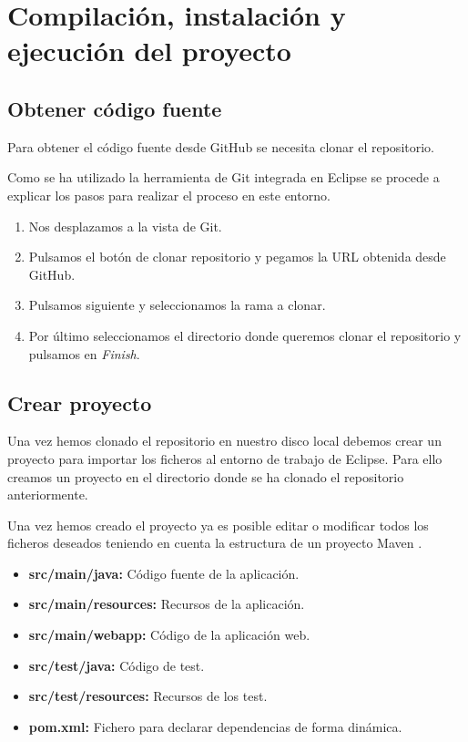 \section{Compilación, instalación y ejecución del proyecto}

\subsection{Obtener código fuente}

Para obtener el código fuente desde GitHub se necesita clonar el repositorio.

Como se ha utilizado la herramienta de Git integrada en Eclipse se procede a explicar los pasos para realizar el proceso en este entorno.

\begin{enumerate}
\item Nos desplazamos a la vista de Git.
\item Pulsamos el botón de clonar repositorio y pegamos la URL obtenida desde GitHub.
\item Pulsamos siguiente y seleccionamos la rama a clonar.
\item Por último seleccionamos el directorio donde queremos clonar el repositorio y pulsamos en \emph{Finish}.
\end{enumerate}

\subsection{Crear proyecto}

Una vez hemos clonado el repositorio en nuestro disco local debemos crear un proyecto para importar los ficheros al entorno de trabajo de Eclipse. Para ello creamos un proyecto en el directorio donde se ha clonado el repositorio anteriormente.


Una vez hemos creado el proyecto ya es posible editar o modificar todos los ficheros deseados teniendo en cuenta la estructura de un proyecto Maven \cite{maven:dir}.

\begin{itemize}
\item \textbf{src/main/java:} Código fuente de la aplicación.
\item \textbf{src/main/resources:} Recursos de la aplicación.
\item \textbf{src/main/webapp:} Código de la aplicación web.
\item \textbf{src/test/java:} Código de test.
\item \textbf{src/test/resources:} Recursos de los test.
\item \textbf{pom.xml:} Fichero para declarar dependencias de forma dinámica.
\end{itemize}


